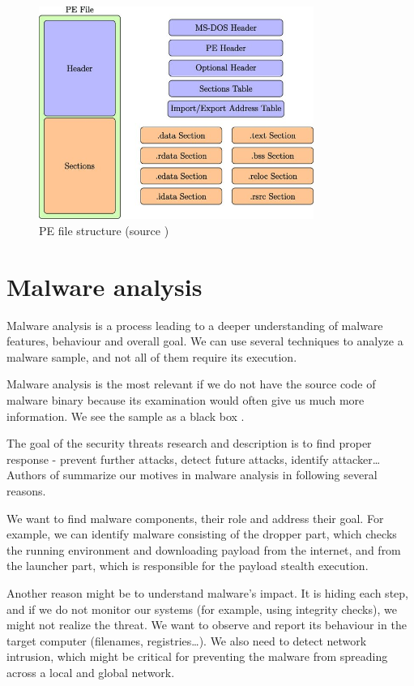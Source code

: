 \begin{figure}[h]
  \centering
  \includegraphics[width=0.8\textwidth]{figures/pe.jpg}
  \caption{PE file structure (source \cite{Gibert2020})}
  \label{fig:pe}
\end{figure}

\section{Malware analysis}
Malware analysis is a process leading to a deeper understanding of malware features, behaviour and overall goal. We can use several techniques to analyze a malware sample, and not all of them require its execution.

Malware analysis is the most relevant if we do not have the source code of malware binary because its examination would often give us much more information. We see the sample as a black box \cite{Sikorski2012}.

The goal of the security threats research and description is to find proper response - prevent further attacks, detect future attacks, identify attacker\dots Authors of \cite{KA2018} summarize our motives in malware analysis in following several reasons. 

We want to find malware components, their role and address their goal. For example, we can identify malware consisting of the dropper part, which checks the running environment and downloading payload from the internet, and from the launcher part, which is responsible for the payload stealth execution. 

Another reason might be to understand malware's impact. It is hiding each step, and if we do not monitor our systems (for example, using integrity checks), we might not realize the threat. We want to observe and report its behaviour in the target computer (filenames, registries\dots). We also need to detect network intrusion, which might be critical for preventing the malware from spreading across a local and global network. 

